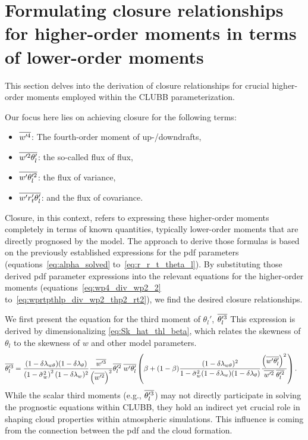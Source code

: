 \section{Formulating closure relationships for higher-order moments in terms of lower-order moments}
\label{sec:formulating-closure-relationships-for-higher-order-moments-in-terms-of-lower-order-moments}

This section delves into the derivation of closure relationships for crucial higher-order moments
employed within the \gls{CLUBB} parameterization.

Our focus here lies on achieving closure for the following terms:
\begin{itemize}
    \item $\overline{w'^4}$: The fourth-order moment of up-/downdrafts,
    \item $\overline{w'^2 \theta_l'}$: the so-called flux of flux,
    \item $\overline{w' \theta_l'^2}$: the flux of variance,
    \item $\overline{w' r_t' \theta_l'}$: and the flux of covariance.
\end{itemize}
Closure, in this context,
refers to expressing these higher-order moments completely in terms of known quantities,
typically lower-order moments that are directly prognosed by the model.
The approach to derive those formulas is based on
the previously established expressions for the \gls{pdf} parameters (equations~\eqref{eq:alpha_solved} to~\eqref{eq:r_r_t_theta_l}).
By substituting those derived \gls{pdf} parameter expressions
into the relevant equations for the higher-order moments (equations~\eqref{eq:wp4_div_wp2_2} to~\eqref{eq:wprtpthlp_div_wp2_thp2_rt2}),
we find the desired closure relationships.

We first present the equation for the third moment of $\theta_l'$, $\overline{\theta_l'^3}$
This expression is derived by dimensionalizing \cref{eq:Sk_hat_thl_beta},
which relates the skewness of $\theta_l$ to the skewness of $w$ and other model parameters.
\begin{align}
    \label{eq:thlp3_beta}
    \overline{\theta_l'^3}
    &= \frac{(1-\delta \lambda_{w \theta})(1-\delta \lambda_\theta)}{\left( 1 - \tilde{\sigma}_w^2 \right)^2 (1-\delta \lambda_w)^2}
    \frac{\overline{w'^3}}{\left( \overline{w'^2} \right)^2}
    \overline{\theta_l'^2} \;
    \overline{w' \theta_l'}
    \left(\beta + (1-\beta)
    \frac{(1-\delta \lambda_{w \theta})^2}{1-{\tilde{\sigma}_w}^2 (1-\delta \lambda_w)(1-\delta \lambda_\theta)}
    \frac{\left(\overline{w' \theta_l'}\right)^2}{\overline{w'^2} \; \overline{\theta_l'^2}}\right).
\end{align}
While the scalar third moments (e.g., $\overline{\theta_l'^3}$) may not directly participate
in solving the prognostic equations within \gls{CLUBB},
they hold an indirect yet crucial role in shaping cloud properties within atmospheric simulations.
This influence is coming from the connection between the \gls{pdf} and the cloud formation.

